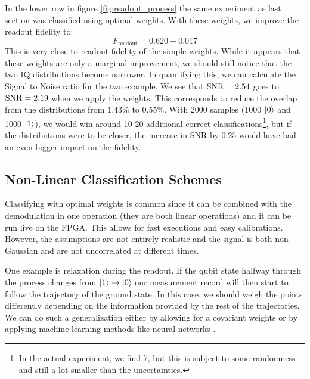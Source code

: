 In the lower row in figure \ref{fig:readout_process} the same experiment as last section was classified using optimal weights. With these weights, we improve the readout fidelity to:
\begin{equation}
    F_{\text{readout}} = 0.620 \pm 0.017
\end{equation}
This is very close to readout fidelity of the simple weights. While it appears that these weights are only a marginal improvement, we should still notice that the two IQ distributions become narrower. In quantifying this, we can calculate the Signal to Noise ratio for the two example. We see that $\operatorname{SNR} = 2.54$ goes to $\operatorname{SNR} = 2.19$ when we apply the weights. This corresponds to reduce the overlap from the distributions from $1.43\%$ to $0.55\%$. With 2000 samples (1000 $\ket{0}$ and 1000 $\ket{1}$), we would win around 10-20 additional correct classifications\footnote{In the actual experiment, we find 7, but this is subject to some randomness and still a lot smaller than the uncertainties.}, but if the distributions were to be closer, the increase in SNR by $0.25$ would have had an even bigger impact on the fidelity.


\subsection{Non-Linear Classification Schemes}
Classifying with optimal weights is common since it can be combined with the demodulation in one operation (they are both linear operations) and it can be run live on the FPGA. This allows for fast executions and easy calibrations. However, the assumptions are not entirely realistic and the signal is both non-Gaussian and are not uncorrelated  at different times.

One example is relaxation during the readout. If the qubit state halfway through the process changes from $\ket{1}\to \ket{0}$ our measurement record will then start to follow the trajectory of the ground state. In this case, we should weigh the points differently depending on the information provided by the rest of the trajectories. We can do such a generalization either by allowing for a covariant weights\cite{gambetta_protocols_2007} or by applying machine learning methods like neural networks \cite{lienhard_deep-neural-network_2022}.




